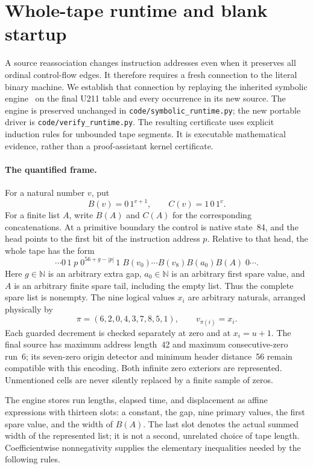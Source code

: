 \section{Whole-tape runtime and blank startup}
\label{sec:runtime}

A source reassociation changes instruction addresses even when it preserves
all ordinal control-flow edges. It therefore requires a fresh connection to
the literal binary machine. We establish that connection by replaying the
inherited symbolic engine~\cite{proposal1} on the final U211 table and every
occurrence in its new source. The engine is preserved unchanged in
\texttt{code/symbolic\_runtime.py}; the new portable driver is
\texttt{code/verify\_runtime.py}. The resulting certificate uses explicit
induction rules for unbounded tape segments. It is executable mathematical
evidence, rather than a proof-assistant kernel certificate.

\paragraph{The quantified frame.}
For a natural number $v$, put
\[
 B(v)=0\,1^{v+1},\qquad C(v)=1\,0\,1^v.
\]
For a finite list $A$, write $B(A)$ and $C(A)$ for the corresponding
concatenations. At a primitive boundary the control is native state~84,
and the head points to the first bit of the instruction address $p$.
Relative to that head, the whole tape has the form
\[
 \cdots 0\,1\;p\;0^{56+g-|p|}\,1\;
 B(v_0)\cdots B(v_8)B(a_0)B(A)\;0\cdots .
\]
Here $g\in\mathbb N$ is an arbitrary extra gap, $a_0\in\mathbb N$ is an
arbitrary first spare value, and $A$ is an arbitrary finite spare tail,
including the empty list. Thus the complete spare list is nonempty.
The nine logical values $x_i$ are arbitrary naturals, arranged physically
by
\[
 \pi=(6,2,0,4,3,7,8,5,1),\qquad v_{\pi(i)}=x_i.
\]
Each guarded decrement is checked separately at zero and at $x_i=u+1$.
The final source has maximum address length~42 and maximum consecutive-zero
run~6; its seven-zero origin detector and minimum header distance~56 remain
compatible with this encoding. Both infinite zero exteriors are represented.
Unmentioned cells are never silently replaced by a finite sample of zeros.

The engine stores run lengths, elapsed time, and displacement as affine
expressions with thirteen slots: a constant, the gap, nine primary values,
the first spare value, and the width of $B(A)$. The last slot denotes the
actual summed width of the represented list; it is not a second, unrelated
choice of tape length. Coefficientwise nonnegativity supplies the elementary
inequalities needed by the following rules.

